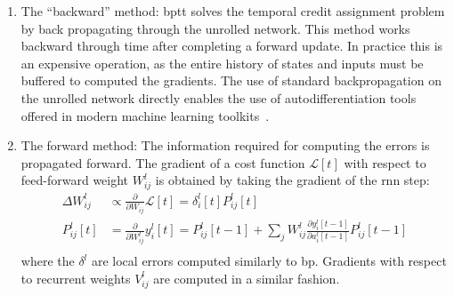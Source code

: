 \documentclass[journal,onecolumn,11pt]{IEEEtran}
\newcommand{\reffig}[1]{{\color{blue!70}(Fig.~\ref{#1})}}
\newcommand{\Dp}[2][]{\frac{\partial #1}{\partial #2}}
\begin{document}
\begin{enumerate}
\item The ``backward'' method:  
\gls{bptt} solves the temporal credit assignment problem by back propagating through the unrolled network.
This method works backward through time after completing a forward update.
In practice this is an expensive operation, as the entire history of states and inputs must be buffered to computed the gradients.
The use of standard backpropagation on the unrolled network directly enables the use of autodifferentiation tools offered in modern machine learning toolkits~\cite{Bellec_etal18_longshor,Shrestha_Orchard18_slayspik,Wozniak_etal18_deepnetw}.\\
\item The forward method: The information required for computing the errors is propagated forward.
The gradient of a cost function $\mathcal{L}[t]$ with respect to feed-forward weight $W_{ij}^l$ is obtained by taking the gradient of the \Gls{rnn} step:
\[
\begin{split} \label{eq:forward_mode_differentiation}
 \Delta {W_{ij}^l} &\propto \Dp{W_{ij}}\mathcal{L}[t]  = \delta_i^l[t] P_{ij}^l[t]\\
 P_{ij}^l[t]     &= \frac{\partial} {\partial W_{ij}^l}  y_i^l[t] = P_{ij}^l[t-1] + \sum_j W_{ij}^l \Dp[{y_i^l[t-1]}]{{a_i^l[t-1]}} P_{ij}^l[t-1]\\
\end{split}
\]
where the $\delta^l$ are local errors computed similarly to \Gls{bp}. 
Gradients with respect to recurrent weights $V_{ij}^l$ are computed in a similar fashion.
\end{enumerate}
\end{document}
